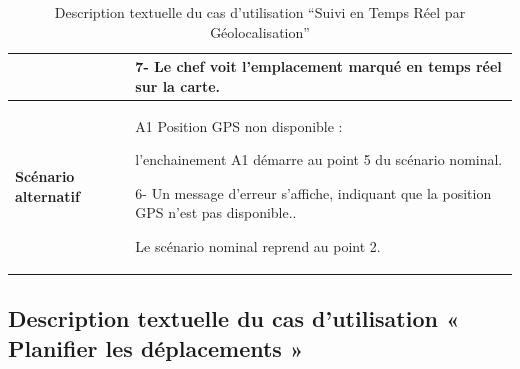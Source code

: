 \begin{table}[H]
    \centering
    \renewcommand{\arraystretch}{1}
    \begin{tabular}{|p{4cm}|p{9cm}|}



                                     & 7- Le chef voit l'emplacement marqué en temps réel sur la carte. \\


        \hline
        \textbf{Scénario alternatif} & A1 Position GPS non disponible : \newline

        l'enchainement A1 démarre au point 5 du scénario nominal.\newline

        6- Un message d'erreur s'affiche, indiquant que la position GPS n'est pas disponible.. \newline

        Le scénario nominal reprend au point 2.                                                         \\

        \hline
    \end{tabular}
    \caption{Description textuelle du cas d’utilisation “Suivi en Temps Réel par Géolocalisation”}

\end{table}




\subsection{Description textuelle du cas d’utilisation « Planifier les déplacements »}

